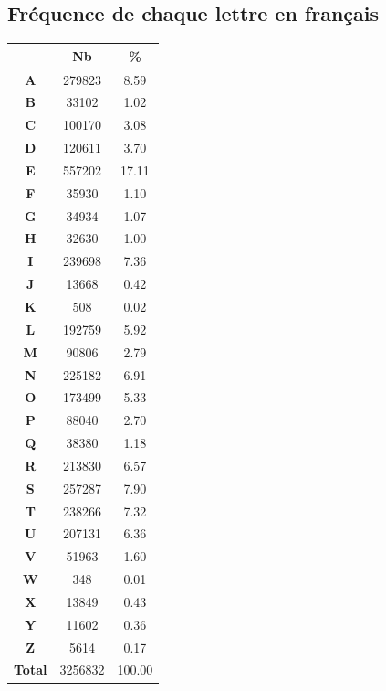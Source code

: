 \documentclass[a4paper, titlepage]{livret}
\begin{document}
\subsection{Fréquence de chaque lettre en français}

\begin{minipage}[c]{.3\linewidth}
  \begin{tabular}{|c|c|c|}
    \hline
	 & \textbf{Nb} & \textbf{\%}\\
	 \hline
    	\textbf{A} &  279823 &  8.59\\
	\hline
	\textbf{B} &   33102 &  1.02\\
	\hline
	\textbf{C} &  100170 &  3.08\\
	\hline
	\textbf{D} &  120611 &  3.70\\
	\hline
	\textbf{E} &  557202 &  17.11\\
	\hline
	\textbf{F} &   35930 &  1.10\\
	\hline
	\textbf{G} &   34934 &  1.07\\
	\hline
	\textbf{H} &   32630 &  1.00\\
	\hline
	\textbf{I} &  239698 &  7.36\\
	\hline
	\textbf{J} &   13668 &  0.42\\
	\hline
	\textbf{K} &     508 &  0.02\\
	\hline
	\textbf{L} &  192759 &  5.92\\
	\hline
	\textbf{M} &   90806 &  2.79\\
	\hline
	\textbf{N} &  225182 &  6.91\\
	\hline
	\textbf{O} &  173499 &  5.33\\
	\hline
	\textbf{P} &   88040 &  2.70\\
	\hline
	\textbf{Q} &   38380 &  1.18\\
	\hline
	\textbf{R} &  213830 &  6.57\\
	\hline
	\textbf{S} &  257287 &  7.90\\
	\hline
	\textbf{T} &  238266 &  7.32\\
	\hline
	\textbf{U} &  207131 &  6.36\\
	\hline
	\textbf{V} &   51963 &  1.60\\
	\hline
	\textbf{W} &     348 &  0.01\\
	\hline
	\textbf{X} &   13849 &  0.43\\
	\hline
	\textbf{Y} &   11602 &  0.36\\
	\hline
	\textbf{Z} &    5614 &  0.17\\
	\hline
	\textbf{Total} &  3256832 &  100.00\\
	\hline
  \end{tabular}
  \label{tab4}
\end{minipage}
\end{document}
